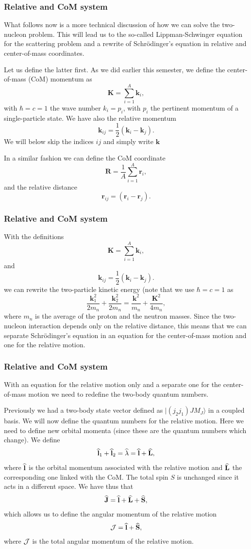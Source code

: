 \documentclass[compress]{beamer}
\newcommand{\OP}[1]{{\bf\widehat{#1}}}
\renewcommand{\vec}[1]{\mathbf{#1}}
\renewcommand{\vec}[1]{\boldsymbol{#1}}
\begin{document}
\frame
{
\frametitle{Relative and CoM system}
\begin{small}
{\scriptsize
What follows now is a more technical discussion of how we can solve the two-nucleon problem.
This will lead us to the so-called Lippman-Schwinger equation for the scattering problem and a rewrite of Schr\"odinger's equation in relative and center-of-mass coordinates. 

Let us define the latter first. As we did earlier this semester, we define
the center-of-mass (CoM)  momentum as
 \[
    \vec{K}=\sum_{i=1}^A\vec{k}_i,
 \]
with $\hbar=c=1$ the wave number $k_i=p_i$, with $p_i$ the pertinent momentum of a single-particle state. 
We have also the relative momentum
\[
    \vec{k}_{ij}=\frac{1}{2}(\vec{k}_i-\vec{k}_j).
 \]
We will below skip the indices $ij$ and simply write $\vec{k}$

 In a similar fashion we can define the CoM coordinate
 \[
     \vec{R}=\frac{1}{A}\sum_{i=1}^{A}\vec{r}_i,
 \]
 and the relative distance 
\[
    \vec{r}_{ij}=(\vec{r}_i-\vec{r}_j).
 \]
}
\end{small}
}


\frame
{
\frametitle{Relative and CoM system}
\begin{small}
{\scriptsize
With the definitions
 \[
    \vec{K}=\sum_{i=1}^A\vec{k}_i,
 \]
and 
\[
    \vec{k}_{ij}=\frac{1}{2}(\vec{k}_i-\vec{k}_j).
 \]
we can rewrite the two-particle kinetic energy (note that we use $\hbar=c=1$ as 
\[
\frac{\vec{k}_1^2}{2m_n}+\frac{\vec{k}_2^2}{2m_n}=\frac{\vec{k}^2}{m_n}+\frac{\vec{K}^2}{4m_n},
\]
where $m_n$ is the average of the proton and the neutron masses. 
Since the two-nucleon interaction depends only on the relative distance, this means that we can separate Schr\"odinger's equation in an equation for the center-of-mass motion and one for the relative motion.
}
\end{small}
}


\frame
{
\frametitle{Relative and CoM system}
\begin{small}
{\scriptsize
With an equation for the relative motion only and a separate one for the center-of-mass motion we need to redefine the two-body quantum numbers.

Previously we had a two-body state vector defined as $|(j_2j_1)JM_J\rangle$ in a coupled basis. 
We will now define the quantum numbers for the relative motion. Here we need to define new orbital momenta (since these are the quantum numbers which change). 
We define 
\[
\OP{l}_1+\OP{l}_2=\OP{\lambda}=\OP{l}+\OP{L},
\]
where $\OP{l}$ is the orbital momentum associated with the relative motion and
$\OP{L}$ the corresponding one linked with the CoM. The total spin $S$ is unchanged since it acts in a different space. We have thus that
\[
\OP{J}=\OP{l}+\OP{L}+\OP{S},
\]
which allows us to define the angular momentum of the relative motion
\[
{ \cal J} =  \OP{l}+\OP{S},
\]
where ${ \cal J}$ is the total angular momentum of the relative motion.
}
\end{small}
}
\end{document}
